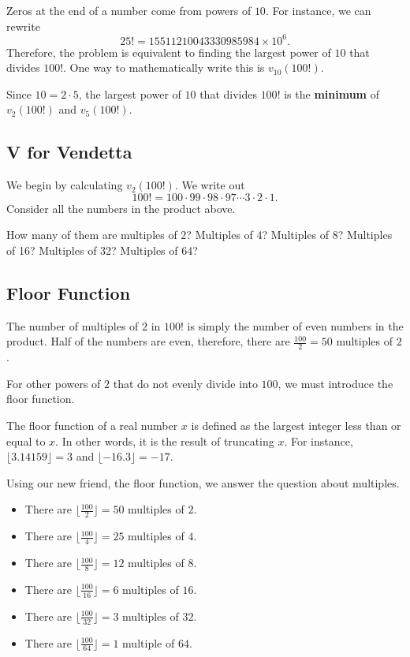 Zeros at the end of a number come from powers of $10$.  For instance, we can rewrite $$25!=15511210043330985984\times 10^6.$$  
Therefore, the problem is equivalent to finding the largest power of $10$ that divides $100!$.  One way to mathematically write this is $v_{10}(100!)$.  

Since $10=2\cdot 5$, the largest power of $10$ that divides $100!$ is the \textbf{minimum} of $v_2(100!)$ and $v_5(100!)$.  

\subsection*{V for Vendetta}

We begin by calculating $v_2(100!)$. We write out $$100!=100\cdot 99\cdot 98\cdot 97\cdots 3\cdot 2\cdot 1.$$  Consider all the numbers in the product above. 

How many of them are multiples of 2?  Multiples of 4?  Multiples of 8?  Multiples of 16?  Multiples of 32?  Multiples of 64?  

\clearpage 

\subsection*{Floor Function}

The number of multiples of $2$ in $100!$ is simply the number of even numbers in the product. Half of the numbers are even, therefore, there are $\frac{100}{2}=50$ multiples of $2$.  

For other powers of $2$ that do not evenly divide into $100$, we must introduce the floor function.  

\begin{defi} The floor function of a real number $x$ is defined as the largest integer less than or equal to $x$. In other words, it is the result of truncating $x$. For instance, $\lfloor 3.14159 \rfloor=3$ and $\lfloor -16.3 \rfloor=-17$. \end{defi}

\clearpage

Using our new friend, the floor function, we answer the question about multiples.
\begin{itemize}  
	\item  There are $\lfloor \frac{100}{2} \rfloor=50$ multiples of $2$.
	\item  There are $\lfloor \frac{100}{4} \rfloor=25$ multiples of $4$.
	\item  There are $\lfloor \frac{100}{8} \rfloor=12$ multiples of $8$.
	\item  There are $\lfloor \frac{100}{16} \rfloor=6$ multiples of $16$.
	\item  There are $\lfloor \frac{100}{32} \rfloor=3$ multiples of $32$.
	\item  There are $\lfloor \frac{100}{64} \rfloor=1$ multiple of $64$.  
\end{itemize}

